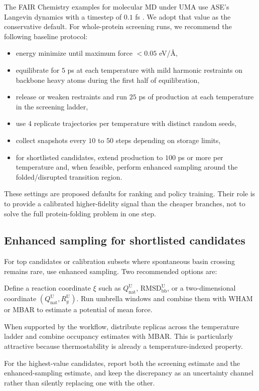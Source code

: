 \documentclass[11pt]{article}
\newcommand{\angstrom}{\ensuremath{\text{\AA}}}
\begin{document}
	The FAIR Chemistry examples for molecular MD under UMA use ASE's Langevin dynamics with a timestep of $0.1$ fs \citep{fairchem2025github}. We adopt that value as the conservative default. For whole-protein screening runs, we recommend the following baseline protocol:
	\begin{itemize}[leftmargin=1.5em]
		\item energy minimize until maximum force $<0.05$ eV/\angstrom,
		\item equilibrate for $5$ ps at each temperature with mild harmonic restraints on backbone heavy atoms during the first half of equilibration,
		\item release or weaken restraints and run $25$ ps of production at each temperature in the screening ladder,
		\item use $4$ replicate trajectories per temperature with distinct random seeds,
		\item collect snapshots every $10$ to $50$ steps depending on storage limits,
		\item for shortlisted candidates, extend production to $100$ ps or more per temperature and, when feasible, perform enhanced sampling around the folded/disrupted transition region.
	\end{itemize}
	These settings are proposed defaults for ranking and policy training. Their role is to provide a calibrated higher-fidelity signal than the cheaper branches, not to solve the full protein-folding problem in one step.
	
	\subsection{Enhanced sampling for shortlisted candidates}
	
	For top candidates or calibration subsets where spontaneous basin crossing remains rare, use enhanced sampling. Two recommended options are:
	\begin{description}[leftmargin=1.5em,style=nextline]
		\item[Umbrella sampling.] Define a reaction coordinate $\xi$ such as $Q_{\mathrm{nat}}^{\mathrm U}$, $\mathrm{RMSD}_{\mathrm{bb}}^{\mathrm U}$, or a two-dimensional coordinate $(Q_{\mathrm{nat}}^{\mathrm U},R_g^{\mathrm U})$. Run umbrella windows and combine them with WHAM or MBAR to estimate a potential of mean force.
		\item[Temperature exchange or stratified replicas.] When supported by the workflow, distribute replicas across the temperature ladder and combine occupancy estimates with MBAR. This is particularly attractive because thermostability is already a temperature-indexed property.
	\end{description}
	For the highest-value candidates, report both the screening estimate and the enhanced-sampling estimate, and keep the discrepancy as an uncertainty channel rather than silently replacing one with the other.
	
\end{document}
